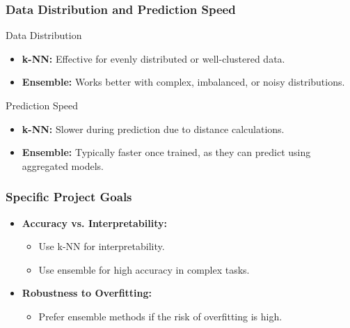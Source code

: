 \documentclass[aspectratio=169]{beamer}
\begin{document}
\begin{frame}[fragile]
    \frametitle{Data Distribution and Prediction Speed}
    \begin{block}{Data Distribution}
        \begin{itemize}
            \item \textbf{k-NN:} Effective for evenly distributed or well-clustered data.
            \item \textbf{Ensemble:} Works better with complex, imbalanced, or noisy distributions.
        \end{itemize}
    \end{block}
    \begin{block}{Prediction Speed}
        \begin{itemize}
            \item \textbf{k-NN:} Slower during prediction due to distance calculations.
            \item \textbf{Ensemble:} Typically faster once trained, as they can predict using aggregated models.
        \end{itemize}
    \end{block}
\end{frame}

\begin{frame}[fragile]
    \frametitle{Specific Project Goals}
    \begin{itemize}
        \item \textbf{Accuracy vs. Interpretability:}
            \begin{itemize}
                \item Use k-NN for interpretability.
                \item Use ensemble for high accuracy in complex tasks.
            \end{itemize}
        \item \textbf{Robustness to Overfitting:}
            \begin{itemize}
                \item Prefer ensemble methods if the risk of overfitting is high.
            \end{itemize}
    \end{itemize}
\end{frame}
\end{document}
